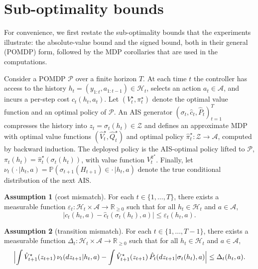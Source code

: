 \documentclass[10pt]{article}
\theoremstyle{definition}
\newtheorem{assumption}{Assumption}
\begin{document}
\section*{Sub-optimality bounds}

For convenience, we first restate the sub-optimality bounds that the
experiments illustrate: the absolute-value bound and the signed bound,
both in their general (POMDP) form, followed by the MDP corollaries
that are used in the computations.

Consider a POMDP $\mathcal{P}$ over a finite horizon $T$. At each time
$t$ the controller has access to the history
$h_t = (y_{1:t}, a_{1:t-1}) \in \mathcal{H}_t$, selects an action
$a_t \in \mathcal{A}$, and incurs a per-step cost $c_t(h_t, a_t)$. Let
$(V^\star_t, \pi^\star_t)$ denote the optimal value function and an
optimal policy of $\mathcal{P}$. An AIS generator
$(\sigma_t, \hat c_t, \hat P_t)_{t=1}^{T}$ compresses the history into
$z_t = \sigma_t(h_t) \in \mathcal{Z}$ and defines an approximate MDP
with optimal value functions $(\hat V^\star_t, \hat Q^\star_t)$ and
optimal policy $\hat\pi^\star_t : \mathcal{Z} \to \mathcal{A}$,
computed by backward induction. The deployed policy is the AIS-optimal
policy lifted to $\mathcal{P}$,
$\pi_t(h_t) = \hat\pi^\star_t(\sigma_t(h_t))$, with value function
$V^{\hat\pi^\star}_t$. Finally, let
$\nu_t(\cdot\,|h_t, a) = \mathbb{P}(\sigma_{t+1}(H_{t+1}) \in \cdot\,|
h_t, a)$ denote the true conditional distribution of the next AIS.

\begin{assumption}[cost mismatch]\label{ass:eps}
For each $t \in \{1, \dots, T\}$, there exists a measurable function
$\varepsilon_t : \mathcal{H}_t \times \mathcal{A} \to \mathbb{R}_{\ge 0}$
such that for all $h_t \in \mathcal{H}_t$ and $a \in \mathcal{A}$,
\[
\bigl|c_t(h_t, a) - \hat c_t(\sigma_t(h_t), a)\bigr|
\le \varepsilon_t(h_t, a).
\]
\end{assumption}

\begin{assumption}[transition mismatch]\label{ass:delta}
For each $t \in \{1, \dots, T-1\}$, there exists a measurable function
$\Delta_t : \mathcal{H}_t \times \mathcal{A} \to \mathbb{R}_{\ge 0}$
such that for all $h_t \in \mathcal{H}_t$ and $a \in \mathcal{A}$,
\[
\Bigl|\int \hat V^\star_{t+1}(z_{t+1})\, \nu_t(dz_{t+1}|h_t, a)
- \int \hat V^\star_{t+1}(z_{t+1})\,
  \hat P_t(dz_{t+1}|\sigma_t(h_t), a)\Bigr|
\le \Delta_t(h_t, a).
\]
\end{assumption}
\end{document}
